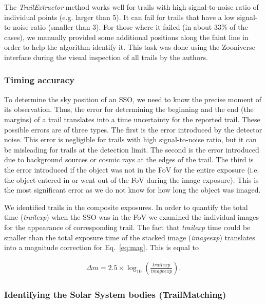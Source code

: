\documentclass{aa}
\begin{document}
The \emph{TrailExtractor} method works well for trails with high signal-to-noise ratio of individual points (e.g. larger than 5). It can fail for trails that have a low signal-to-noise ratio (smaller than 3). For those where it failed (in about 33\% of the cases), we manually provided some additional positions along the faint line in order to help the algorithm identify it. This task was done using the Zooniverse interface during the visual inspection of all trails by the authors.  

\subsubsection{Timing accuracy}
\label{time_accuracy}

To determine the sky position of an SSO, we need to know the precise moment of its observation. Thus, the error for determining the beginning and the end (the margins) of a trail translates into a time uncertainty for the reported trail. These possible errors are of three types. The first is the error introduced by the detector noise. This error is negligible for trails with high signal-to-noise ratio, but it can be misleading for trails at the detection limit. The second is the error introduced due to background sources or cosmic rays at the edges of the trail.
The third is the error introduced if the object was not in the FoV for the entire exposure (i.e. the object entered in or went out of the FoV during the image exposure). This is the most significant error as we do not know for how long the object was imaged.

We identified trails in the composite exposures. In order to quantify the total time (\emph{trailexp}) when the SSO was in the FoV we examined the individual images for the appearance of corresponding trail. The fact that \emph{trailexp} time could be smaller than the total exposure time of the stacked image (\emph{imageexp}) translates into a magnitude correction for Eq.~\ref{eq:mag}. This is equal to


\begin{equation}
\begin{aligned}
    \Delta m = 2.5 \times \log_{10}\left(\frac{trailexp}{imageexp}\right).
\end{aligned}
\label{eq:m}
\end{equation}

\subsubsection{Identifying the Solar System bodies (TrailMatching)}
\label{TrailMatching}
\end{document}
